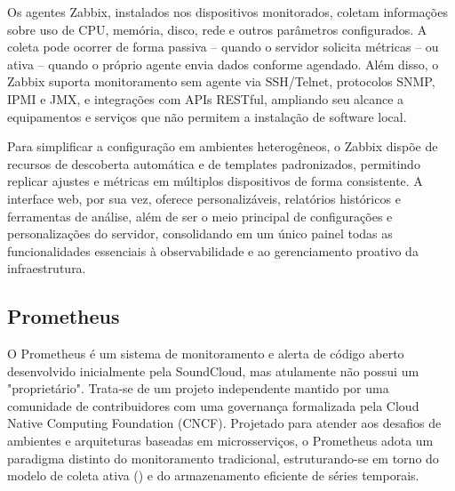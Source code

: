 Os agentes Zabbix, instalados nos dispositivos monitorados, coletam informações sobre uso de CPU, memória, disco, rede e outros parâmetros configurados. A coleta pode ocorrer de forma passiva -- quando o servidor solicita métricas -- ou ativa -- quando o próprio agente envia dados conforme agendado. Além disso, o Zabbix suporta monitoramento sem agente via SSH/Telnet, protocolos SNMP, IPMI e JMX, e integrações com APIs RESTful, ampliando seu alcance a equipamentos e serviços que não permitem a instalação de software local.

Para simplificar a configuração em ambientes heterogêneos, o Zabbix dispõe de recursos de descoberta automática e de templates padronizados, permitindo replicar ajustes e métricas em múltiplos dispositivos de forma consistente. A interface web, por sua vez, oferece  personalizáveis, relatórios históricos e ferramentas de análise, além de ser o meio principal de configurações e personalizações do servidor, consolidando em um único painel todas as funcionalidades essenciais à observabilidade e ao gerenciamento proativo da infraestrutura.

\subsection{Prometheus}
\label{subsection:Prometheus}

O Prometheus \citep{prometheus2025} é um sistema de monitoramento e alerta de código aberto desenvolvido inicialmente pela SoundCloud, mas atulamente não possui um "proprietário". Trata-se de um projeto independente mantido por uma comunidade de contribuidores com uma governança formalizada pela Cloud Native Computing Foundation (CNCF). Projetado para atender aos desafios de ambientes  e arquiteturas baseadas em microsserviços, o Prometheus adota um paradigma distinto do monitoramento tradicional, estruturando-se em torno do modelo de coleta ativa () e do armazenamento eficiente de séries temporais.

